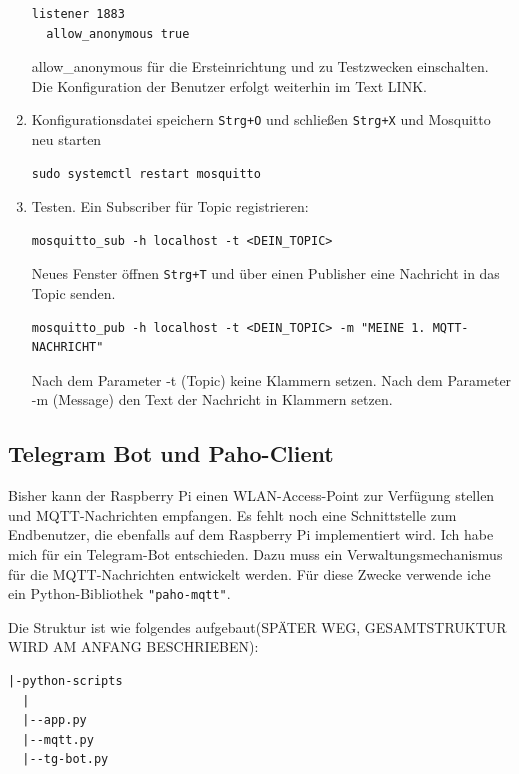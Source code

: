 \documentclass[12pt, letterpaper]{article}
\begin{document}
\begin{enumerate}
\begin{Verbatim}[frame=single]
  listener 1883
  allow_anonymous true
\end{Verbatim}
\par allow\_anonymous für die Ersteinrichtung und zu Testzwecken einschalten. Die Konfiguration der Benutzer erfolgt weiterhin im Text LINK.
\item Konfigurationsdatei speichern \texttt{Strg+O} und schließen \texttt{Strg+X} und Mosquitto neu starten 
\begin{Verbatim}[frame=single]
  sudo systemctl restart mosquitto
\end{Verbatim}
  \item Testen. Ein Subscriber für Topic registrieren: 
\begin{Verbatim}[frame=single]
  mosquitto_sub -h localhost -t <DEIN_TOPIC>
\end{Verbatim}
\par Neues Fenster öffnen \texttt{Strg+T} und über einen Publisher eine Nachricht in das Topic senden.
\begin{Verbatim}[frame=single]
  mosquitto_pub -h localhost -t <DEIN_TOPIC> -m "MEINE 1. MQTT-NACHRICHT"
\end{Verbatim}
\par Nach dem Parameter -t (Topic) keine Klammern setzen. Nach dem Parameter -m (Message) den Text der Nachricht in Klammern setzen.
\end{enumerate}
\subsection{Telegram Bot und Paho-Client}
\par Bisher kann der Raspberry Pi einen WLAN-Access-Point zur Verfügung stellen und MQTT-Nachrichten empfangen. Es fehlt noch eine Schnittstelle zum Endbenutzer, die ebenfalls auf dem Raspberry Pi implementiert wird. Ich habe mich für ein Telegram-Bot entschieden. Dazu muss ein Verwaltungsmechanismus für die MQTT-Nachrichten entwickelt werden. Für diese Zwecke verwende iche ein Python-Bibliothek \texttt{"paho-mqtt"}.
\par Die Struktur ist wie folgendes aufgebaut(SPÄTER WEG, GESAMTSTRUKTUR WIRD AM ANFANG BESCHRIEBEN):
\begin{Verbatim}[frame=single]
  |-python-scripts
  |
  |--app.py
  |--mqtt.py
  |--tg-bot.py
\end{Verbatim}
\end{document}
